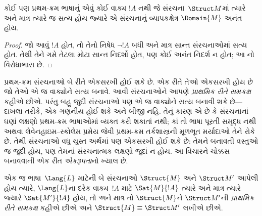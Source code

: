 \begin{prop}
કોઈ પણ પ્રથમ-ક્રમ ભાષાનું એવું કોઈ વાક્ય $!A$ નથી જે
સંરચના~$\Struct M$માં ત્યારે અને માત્ર ત્યારે જ સત્ય હોય જ્યારે
એ સંરચનાનું વ્યાપકક્ષેત્ર $\Domain{M}$ અનંત હોય.
\end{prop}

\begin{proof}
જો આવું $!A$ હોત, તો તેનો નિષેધ $\lnot !A$ બધી અને માત્ર સાન્ત
સંરચનાઓમાં સત્ય હોત. તેથી તેને ગમે તેટલા મોટા સાન્ત નિદર્શો હોત,
પણ કોઈ અનંત નિદર્શ ન હોત; આ નો વિરોધાભાસ છે.
\end{proof}
\endgroup


\begingroup
\makeatletter{}\makeatother

\label{guunit:OLP-0187}


પ્રથમ-ક્રમ સંરચનાઓ બે રીતે એકસરખી હોઈ શકે છે. એક રીતે તેઓ
એકસરખી હોય છે જો તેઓ એ જ વાક્યોને સત્ય બનાવે. આવી
સંરચનાઓને આપણે \emph{પ્રાથમિક રીતે સમકક્ષ} કહીએ છીએ. પરંતુ બહુ
જુદી સંરચનાઓ પણ એ જ વાક્યોને સત્ય બનાવી શકે છે---દાખલા તરીકે,
એક ગણનીય હોઈ શકે અને બીજી નહિ. તેનું કારણ એ છે કે
સંરચનાનાં ઘણાં લક્ષણો પ્રથમ-ક્રમ ભાષાઓમાં વ્યક્ત કરી શકાતાં નથી;
કાં તો ભાષા પૂરતી સમૃદ્ધ નથી અથવા લેવેનહાઇમ--સ્કોલેમ પ્રમેય જેવી
પ્રથમ-ક્રમ તર્કશાસ્ત્રની મૂળભૂત મર્યાદાઓ તેને રોકે છે. તેથી
સંરચનાઓ વધુ ચુસ્ત અર્થમાં પણ એકસરખી હોઈ શકે છે: તેમને બનાવતી
વસ્તુઓ જ જુદી હોય, પણ તેમનાં સંરચનાત્મક લક્ષણો જુદાં ન હોય. આ વિચારને
ચોક્કસ બનાવવાની એક રીત \emph{એકરૂપતા}નો ખ્યાલ છે.

\begin{defn}
એક જ ભાષા~$\Lang{L}$ માટેની બે સંરચનાઓ $\Struct{M}$ અને
$\Struct M'$ આપેલી હોય ત્યારે, $\Lang{L}$ના દરેક વાક્ય~$!A$ માટે
$\Sat{M}{!A}$ ત્યારે અને માત્ર ત્યારે જ્યારે $\Sat{M'}{!A}$ હોય, તો અને
માત્ર તો $\Struct{M}$ને $\Struct M'$ની \emph{પ્રાથમિક રીતે સમકક્ષ}
કહીએ છીએ અને $\Struct{M} \equiv \Struct M'$ લખીએ છીએ.
\end{defn}

